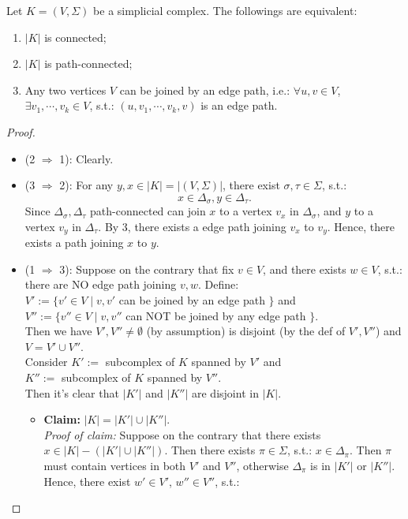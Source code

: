 \begin{proposition}
    Let $K=(V,\Sigma)$ be a simplicial complex. The followings are equivalent:
    \begin{enumerate}
        \item $|K|$ is connected;
        \item $|K|$ is path-connected;
        \item Any two vertices $V$ can be joined by an edge path, i.e.: $\forall u,v \in V$, $\exists v_1,\cdots,v_k \in V$, s.t.: $(u,v_1,\cdots,v_k,v)$ is an edge path.
    \end{enumerate}
\end{proposition}

\begin{proof}
    \begin{itemize}
        \item (2 $\Rightarrow$ 1): Clearly.
        \item (3 $\Rightarrow$ 2): For any $y,x \in |K| = |(V,\Sigma)|$, there exist $\sigma ,\tau \in \Sigma$, s.t.: $$x \in \Delta_\sigma,y \in \Delta_\tau.$$
        Since $\Delta_\sigma,\Delta_\tau$ path-connected can join $x$ to a vertex $v_x$ in $\Delta_\sigma$, and $y$ to a vertex $v_y$ in $\Delta_\tau$. By 3, there exists a edge path joining $v_x$ to $v_y$. Hence, there exists a path joining $x$ to $y$.
        \item (1 $\Rightarrow$ 3): Suppose on the contrary that fix $v \in V$, and there exists $w \in V$, s.t.: there are NO edge path joining $v,w$. Define:\\
        $V' := \{ v' \in V \mid v,v'$ can be joined by an edge path $\}$ and \\
        $V'' := \{ v'' \in V \mid v,v''$ can NOT be joined by any edge path $\}$.\\
        Then we have $V',V'' \neq \emptyset$ (by assumption) is disjoint (by the def of $V',V''$) and $V = V' \cup V''$.\\
        Consider $K' :=$ subcomplex of $K$ spanned by $V'$ and\\
        $K'' :=$ subcomplex of $K$ spanned by $V''$.\\
        Then it's clear that $|K'|$ and $|K''|$ are disjoint in $|K|$.
        \begin{itemize}
            \item \textbf{Claim:} $|K| = |K'| \cup |K''|$.\\
            \textit{Proof of claim:} Suppose on the contrary that there exists $x \in |K| - (|K'| \cup |K''|)$. Then there exists $\pi \in \Sigma$, s.t.: $x \in \Delta_\pi$. Then $\pi$ must contain vertices in both $V'$ and $V''$, otherwise $\Delta_\pi$ is in $|K'|$ or $|K''|$. Hence, there exist $w' \in V'$, $w'' \in V''$, s.t.:

\end{itemize}
\end{itemize}
\end{proof}
